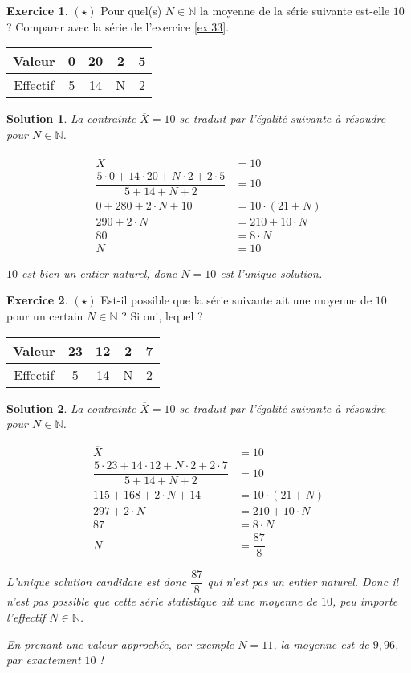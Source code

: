 \documentclass[a4paper, 14pt]{extarticle}
\theoremstyle{plain}
\newtheorem*{sol}{Solution}
\theoremstyle{definition}
\newtheorem{ex}{Exercice}
\newcommand{\N}{\mathbb{N}}
\newcommand{\exe}[2]{
		\begin{ex} #1  \end{ex}
		\begin{sol} #2 \end{sol}
	}
\newcommand{\exe}[2]{
		\begin{ex} #1  \end{ex}
	}
\begin{document}

\exe{$(\star)$
	Pour quel(s) $N\in\N$ la moyenne de la série suivante est-elle $10$ ? Comparer avec la série de l'exercice \ref{ex:33}.
	
		\begin{center}
		\begin{tabular}{|c|c|c|c|c|}\hline
		Valeur   & 0 & 20 & 2 & 5 \\ \hline
		Effectif & 5 & 14 & N & 2  \\ \hline
		\end{tabular}
		\end{center}
}{
	La contrainte $\overline{X} = 10$ se traduit par l'égalité suivante à résoudre pour $N\in\N$.
	
		\begin{align*}
			\overline{X} &= 10 \\
			\dfrac{5\cdot0 + 14\cdot20 + N\cdot2 + 2\cdot5}{5+14+N+2} &= 10 \\
			0  + 280 + 2\cdot N + 10 &= 10 \cdot(21 + N) \\
			290 + 2 \cdot N &= 210 + 10 \cdot N \\
			80 &= 8 \cdot N \\
			N &= 10		
		\end{align*}

	$10$ est bien un entier naturel, donc $N=10$ est l'unique solution.
}

\exe{$(\star)$
	Est-il possible que la série suivante ait une moyenne de $10$ pour un certain $N\in\N$ ? Si oui, lequel ?
	
		\begin{center}
		\begin{tabular}{|c|c|c|c|c|}\hline
		Valeur   & 23 & 12 & 2 & 7 \\ \hline
		Effectif & 5 & 14 & N & 2  \\ \hline
		\end{tabular}
		\end{center}
}{
	La contrainte $\overline{X} = 10$ se traduit par l'égalité suivante à résoudre pour $N\in\N$.
	
		\begin{align*}
			\overline{X} &= 10 \\
			\dfrac{5\cdot23 + 14\cdot12 + N\cdot2 + 2\cdot7}{5+14+N+2} &= 10 \\
			115  + 168 + 2\cdot N + 14 &= 10 \cdot(21 + N) \\
			297 + 2 \cdot N &= 210 + 10 \cdot N \\
			87 &= 8 \cdot N \\
			N &= \dfrac{87}8		
		\end{align*}

	L'unique solution candidate est donc $\dfrac{87}{8}$ qui n'est pas un entier naturel.
	Donc il n'est pas possible que cette série statistique ait une moyenne de $10$, peu importe l'effectif $N\in\N$.
	
	En prenant une valeur approchée, par exemple $N=11$, la moyenne est de $9,96$, par exactement $10$ !
}
\end{document}
